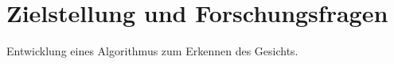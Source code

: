 \chapter{Zielstellung und Forschungsfragen}\label{sec:Zielstellung}

Entwicklung eines Algorithmus zum Erkennen des Gesichts.
